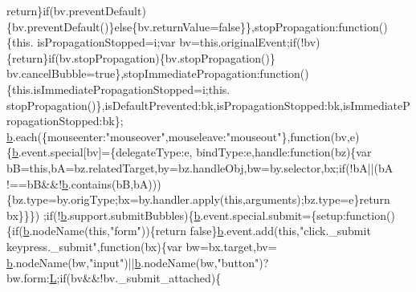 \begin{DoxyCode}
{      return}\}\textcolor{keywordflow}{if}(bv.preventDefault)\{bv.preventDefault()\}\textcolor{keywordflow}{else}\{bv.returnValue=\textcolor{keyword}{false}\}\},stopPropagation:\textcolor{keyword}{function}()\{this.
      isPropagationStopped=i;var bv=this.originalEvent;\textcolor{keywordflow}{if}(!bv)\{\textcolor{keywordflow}{return}\}\textcolor{keywordflow}{if}(bv.stopPropagation)\{bv.stopPropagation()\}
      bv.cancelBubble=\textcolor{keyword}{true}\},stopImmediatePropagation:\textcolor{keyword}{function}()\{this.isImmediatePropagationStopped=i;this.
      stopPropagation()\},isDefaultPrevented:bk,isPropagationStopped:bk,isImmediatePropagationStopped:bk\};
      \hyperlink{docs_2_programmer's_manual_2html_2jquery_8js_aa4026ad5544b958e54ce5e106fa1c805}{b}.each(\{mouseenter:\textcolor{stringliteral}{"mouseover"},mouseleave:\textcolor{stringliteral}{"mouseout"}\},\textcolor{keyword}{function}(bv,e)\{\hyperlink{docs_2_programmer's_manual_2html_2jquery_8js_aa4026ad5544b958e54ce5e106fa1c805}{b}.event.special[bv]=\{delegateType:e,
      bindType:e,handle:\textcolor{keyword}{function}(bz)\{var bB=\textcolor{keyword}{this},bA=bz.relatedTarget,by=bz.handleObj,bw=by.selector,bx;\textcolor{keywordflow}{if}(!bA||(bA
      !==bB&&!\hyperlink{docs_2_programmer's_manual_2html_2jquery_8js_aa4026ad5544b958e54ce5e106fa1c805}{b}.contains(bB,bA)))\{bz.type=by.origType;bx=by.handler.apply(\textcolor{keyword}{this},arguments);bz.type=e\}\textcolor{keywordflow}{return} bx\}\}\})
      ;\textcolor{keywordflow}{if}(!\hyperlink{docs_2_programmer's_manual_2html_2jquery_8js_aa4026ad5544b958e54ce5e106fa1c805}{b}.support.submitBubbles)\{\hyperlink{docs_2_programmer's_manual_2html_2jquery_8js_aa4026ad5544b958e54ce5e106fa1c805}{b}.event.special.submit=\{setup:\textcolor{keyword}{function}()\{\textcolor{keywordflow}{if}(\hyperlink{docs_2_programmer's_manual_2html_2jquery_8js_aa4026ad5544b958e54ce5e106fa1c805}{b}.nodeName(\textcolor{keyword}{this},\textcolor{stringliteral}{"form"}))\{\textcolor{keywordflow}{return}
       \textcolor{keyword}{false}\}\hyperlink{docs_2_programmer's_manual_2html_2jquery_8js_aa4026ad5544b958e54ce5e106fa1c805}{b}.event.add(\textcolor{keyword}{this},\textcolor{stringliteral}{"click.\_submit keypress.\_submit"},\textcolor{keyword}{function}(bx)\{var bw=bx.target,bv=
      \hyperlink{docs_2_programmer's_manual_2html_2jquery_8js_aa4026ad5544b958e54ce5e106fa1c805}{b}.nodeName(bw,\textcolor{stringliteral}{"input"})||\hyperlink{docs_2_programmer's_manual_2html_2jquery_8js_aa4026ad5544b958e54ce5e106fa1c805}{b}.nodeName(bw,\textcolor{stringliteral}{"button"})?bw.form:\hyperlink{docs_2_programmer's_manual_2html_2jquery_8js_a38ee4c0b5f4fe2a18d0c783af540d253}{L};\textcolor{keywordflow}{if}(bv&&!bv.\_submit\_attached)\{

\end{DoxyCode}
